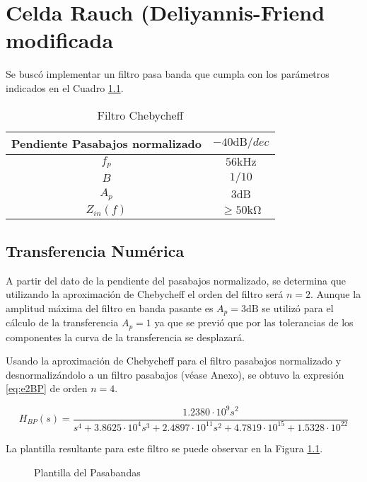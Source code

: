 \chapter{Celda Rauch (Deliyannis-Friend modificada}

Se buscó implementar un filtro pasa banda que cumpla con los parámetros indicados en el Cuadro \ref{tab:e2spec}.

\begin{table}[ht]
\begin{center}
\begin{tabular}{||c|c||}
\hline
Pendiente Pasabajos normalizado	&	$-40 \si{\deci\bel}/dec$ \\
\hline
$f_p$ & $56 \si{\kilo\hertz}$\\
\hline
$B$ & $1/10$\\
\hline
$A_p$ & $3\si{\deci\bel}$\\
\hline
$Z_{in}(f)$ & $\geq 50 \si{\kilo\ohm}$\\
\hline
\end{tabular}
\caption{Filtro Chebycheff}
\label{tab:e2spec}
\end{center}
\end{table}

\section{Transferencia Numérica}

A partir del dato de la pendiente del pasabajos normalizado, se determina que utilizando la aproximación de Chebycheff el orden del filtro será $n=2$. Aunque la amplitud máxima del filtro en banda pasante es $A_p = 3 \si{\deci\bel}$ se utilizó para el cálculo de la transferencia $A_p = 1$ ya que se previó que por las tolerancias de los componentes la curva de la transferencia se desplazará.

Usando la aproximación de Chebycheff para el filtro pasabajos normalizado y desnormalizándolo a un filtro pasabajos (véase Anexo), se obtuvo la expresión \eqref{eq:e2BP} de orden $n=4$.

\begin{equation}
H_{BP}(s)=\frac{1.2380\cdot10^9s^2}{s^4+3.8625\cdot10^4 s^3+2.4897\cdot10^{11}s^2+4.7819\cdot10^{15}+1.5328\cdot10^{22}}
\label{eq:e2BP}
\end{equation}

La plantilla resultante para este filtro se puede observar en la Figura \ref{fig:e2template}.

\begin{figure}[ht]
\begin{center}

\end{center}
\caption{Plantilla del Pasabandas}
\label{fig:e2template}
\end{figure}

